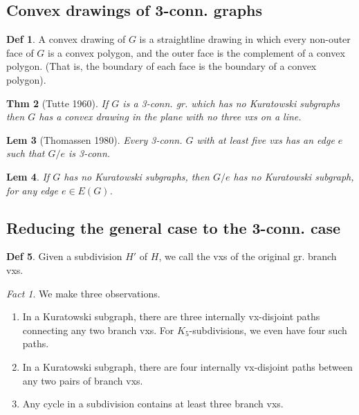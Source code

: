 \documentclass[11pt, fleqn, a4paper, landscape]{article}
\theoremstyle{plain} %
\newtheorem{thm}{Thm}
\newtheorem{lem}[thm]{Lem}
\theoremstyle{remark} %
\newtheorem{fact}{Fact}
\theoremstyle{definition} %
\newtheorem{defi}[thm]{Def}
\begin{document}
\begin{multicols}{5}
\subsection{Convex drawings of 3-conn. graphs}

\begin{defi}
A convex drawing of $G$ is a straightline drawing in which every non-outer face of $G$ is a convex polygon, and the outer face is the complement of a convex polygon. (That is, the boundary of each face is the boundary of a convex polygon).
\end{defi}

\begin{thm}[Tutte 1960]
If $G$ is a 3-conn. gr. which has no Kuratowski subgraphs then
$G$ has a convex drawing in the plane with no three vxs on a line.
\end{thm}

\begin{lem}[Thomassen 1980]
Every 3-conn. $G$ with at least five vxs has an edge
$e$ such that $G\slash e$ is 3-conn.
\end{lem}

\begin{lem}
If $G$ has no Kuratowski subgraphs, then $G\slash e$ has no Kuratowski subgraph, for any edge $e\in E(G)$.
\end{lem}

\subsection{Reducing the general case to the 3-conn. case}

\begin{defi}
Given a subdivision $H'$ of $H$, we call the vxs of the original gr. branch vxs.
\end{defi}
\addtocounter{thm}{1}
\begin{fact}
We make three observations. 
\begin{enumerate}
\item  In a Kuratowski subgraph, there are three internally vx-disjoint paths connecting any two
branch vxs. For $K_5$-subdivisions, we even have four such paths.
\item In a Kuratowski subgraph, there are four internally vx-disjoint paths between any two pairs
of branch vxs.
\item Any cycle in a subdivision contains at least three branch vxs.
\end{enumerate}
\end{fact}


\end{multicols}
\end{document}
